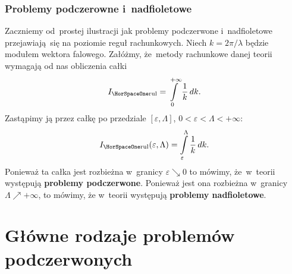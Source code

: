 \documentclass[10pt,t]{beamer}
\begin{document}
\begin{frame}[label=sld-Problemy-podczerwone-i-nadfioletowe]
  \frametitle{Problemy podczerowne i~nadfioletowe}


  Zaczniemy od~prostej ilustracji jak problemy podczerwone i~nadfioletowe
  przejawiają~się na poziomie reguł rachunkowych. Niech $k = 2 \pi / \lambda$
  będzie modułem wektora falowego. Załóżmy, że~metody rachunkowe danej
  teorii wymagają od nas obliczenia całki
  \begin{equation}
    \label{eq:Czym-sa-problemy-ETC-01}
    I_{ \HorSpaceOne \text{rul} } = \int\limits_{ 0 }^{ +\infty } \frac{ 1 }{ k } \, dk.
  \end{equation}
  Zastąpimy ją przez całkę po przedziale $[ \varepsilon, \Lambda ]$, $0 < \varepsilon < \Lambda < +\infty$:
  \begin{equation}
    \label{eq:Czym-sa-problemy-ETC-02}
    I_{ \HorSpaceOne \text{rul} }( \varepsilon, \Lambda ) =
    \int\limits_{ \varepsilon }^{ \Lambda } \frac{ 1 }{ k } \, dk.
  \end{equation}
  Ponieważ ta całka jest rozbieżna w~granicy $\varepsilon \searrow 0$ to mówimy,
  że~w~teorii występują \textbf{problemy podczerwone}. Ponieważ jest ona
  rozbieżna w~granicy $\Lambda \nearrow +\infty$, to mówimy, że w~teorii występują
  \textbf{problemy nadfioletowe}.

\end{frame}










\section{Główne rodzaje problemów podczerwonych}
\end{document}
